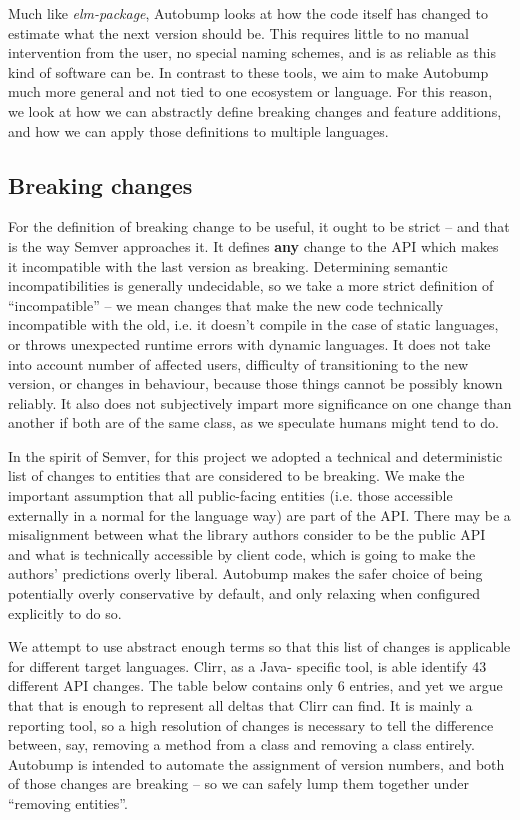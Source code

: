 \documentclass{l4proj}
\begin{document}
Much like \textit{elm-package}, Autobump looks at how the code itself
has changed to estimate what the next version should be. This requires
little to no manual intervention from the user, no special naming
schemes, and is as reliable as this kind of software can be. In
contrast to these tools, we aim to make Autobump much more general and
not tied to one ecosystem or language. For this reason, we look at how
we can abstractly define breaking changes and feature additions, and
how we can apply those definitions to multiple languages.

\subsection{Breaking changes}
\label{BreakingChanges}

For the definition of breaking change to be useful, it ought to be
strict -- and that is the way Semver approaches it. It defines
\textbf{any} change to the API which makes it incompatible with the
last version as breaking. Determining semantic incompatibilities is
generally undecidable, so we take a more strict definition of
``incompatible'' -- we mean changes that make the new code technically
incompatible with the old, i.e. it doesn't compile in the case of
static languages, or throws unexpected runtime errors with dynamic
languages. It does not take into account number of affected users,
difficulty of transitioning to the new version, or changes in
behaviour, because those things cannot be possibly known reliably. It
also does not subjectively impart more significance on one change than
another if both are of the same class, as we speculate humans might
tend to do.

In the spirit of Semver, for this project we adopted a technical and
deterministic list of changes to entities that are considered
to be breaking. We make the important assumption that all
public-facing entities (i.e. those accessible externally in a normal
for the language way) are part of the API. There may be a misalignment
between what the library authors consider to be the public API and
what is technically accessible by client code, which is going to make
the authors' predictions overly liberal. Autobump makes the safer
choice of being potentially overly conservative by default, and only
relaxing when configured explicitly to do so.

We attempt to use abstract enough terms so that this list of changes
is applicable for different target languages. Clirr, as a Java-
specific tool, is able identify 43 different API changes. The table
below contains only 6 entries, and yet we argue that that is enough to
represent all deltas that Clirr can find. It is mainly a reporting
tool, so a high resolution of changes is necessary to tell the
difference between, say, removing a method from a class and removing a
class entirely. Autobump is intended to automate the assignment of
version numbers, and both of those changes are breaking -- so we can
safely lump them together under ``removing entities''.
\end{document}
